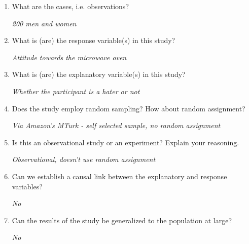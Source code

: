 \documentclass[12pt]{article}
\newcommand{\soln}[2]{\textit{\textcolor{custom_red}{#2}}}{}
\begin{document}
\begin{enumerate}

\item What are the cases, i.e. observations?

\soln{1cm}{200 men and women}

\item What is (are) the response variable(s) in this study?

\soln{1cm}{Attitude towards the microwave oven}

\item What is (are) the explanatory variable(s) in this study?

\soln{1cm}{Whether the participant is a hater or not}

\item Does the study employ random sampling? How about random assignment?

\soln{1cm}{Via Amazon's MTurk - self selected sample, no random assignment}

\item Is this an observational study or an experiment? Explain your reasoning.

\soln{1cm}{Observational, doesn't use random assignment}

\item Can we establish a causal link between the explanatory and response variables?

\soln{1cm}{No}

\item Can the results of the study be generalized to the population at large?

\soln{1cm}{No}

\end{enumerate}
\end{document}
